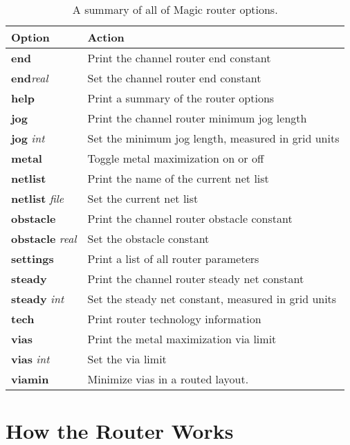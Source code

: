 \documentclass[letterpaper,twoside,12pt]{article}
\begin{document}
\begin{table}[ht]
   \begin{center}
      \begin{tabular}{|l|l|} \hline
	Option	& Action \\ \hline
	{\bfseries end} &
		Print the channel router end constant \\
	{\bfseries end}{\itshape  real}	&
		Set the channel router end constant \\ \hline
	{\bfseries help} &
		Print a summary of the router options \\ \hline
	{\bfseries jog}	&
		Print the channel router minimum jog length \\
	{\bfseries jog} {\itshape int} &
		Set the minimum jog length, measured in grid units \\ \hline
	{\bfseries metal} &
		Toggle metal maximization on or off \\ \hline
	{\bfseries netlist} &
		Print the name of the current net list \\
	{\bfseries netlist} {\itshape file} &
		Set the current net list \\ \hline
	{\bfseries obstacle} &
		Print the channel router obstacle constant \\
	{\bfseries obstacle} {\itshape real} &
		Set the obstacle constant \\ \hline
	{\bfseries settings} &
		Print a list of all router parameters \\ \hline
	{\bfseries steady} &
		Print the channel router steady net constant \\
	{\bfseries steady} {\itshape int} &
		Set the steady net constant, measured in grid units \\ \hline
	{\bfseries tech} &
		Print router technology information \\ \hline
	{\bfseries vias} &
		Print the metal maximization via limit \\
	{\bfseries vias} {\itshape int} &
		Set the via limit \\ \hline
	{\bfseries viamin} &
		Minimize vias in a routed layout. \\ \hline
      \end{tabular}
   \end{center}
   \caption{A summary of all of Magic router options.}
\end{table}


\section{How the Router Works}
\end{document}
